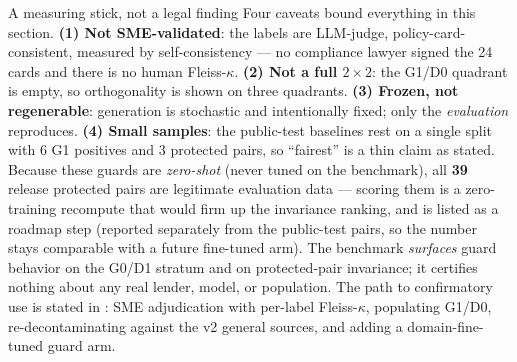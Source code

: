 \begin{takeaway}{A measuring stick, not a legal finding}
Four caveats bound everything in this section. \textbf{(1) Not SME-validated}: the labels are
LLM-judge, policy-card-consistent, measured by self-consistency --- no compliance lawyer signed the 24
cards and there is no human Fleiss-$\kappa$. \textbf{(2) Not a full $2\times2$}: the G1/D0 quadrant is
empty, so orthogonality is shown on three quadrants. \textbf{(3) Frozen, not regenerable}: generation is
stochastic and intentionally fixed; only the \emph{evaluation} reproduces. \textbf{(4) Small samples}:
the public-test baselines rest on a single split with 6 G1 positives and 3 protected pairs, so
``fairest'' is a thin claim as stated. Because these guards are \emph{zero-shot} (never tuned on the
benchmark), all \textbf{39} release protected pairs are legitimate evaluation data --- scoring them is a
zero-training recompute that would firm up the invariance ranking, and is listed as a roadmap step
(reported separately from the public-test pairs, so the number stays comparable with a future
fine-tuned arm). The benchmark \emph{surfaces} guard behavior on the G0/D1 stratum and on protected-pair
invariance; it
certifies nothing about any real lender, model, or population. The path to confirmatory use is stated
in : SME adjudication with per-label Fleiss-$\kappa$, populating G1/D0,
re-decontaminating against the v2 general sources, and adding a domain-fine-tuned guard arm.
\end{takeaway}
